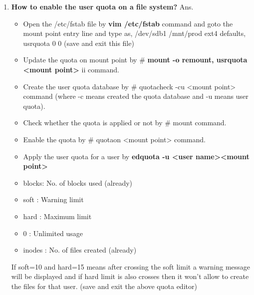 \begin{enumerate}
    \bigskip
    \bigskip

    \item \textbf{How to enable the user quota on a file system?}
    \newline
    Ans.\begin{itemize}
           \item Open the  /etc/fstab   file by  \textbf{ vim  /etc/fstab }command  and  goto the mount point entry line and type as, /dev/sdb1	/mnt/prod	ext4	defaults,  usrquota 	0	0	(save and exit this file)
           \item Update the quota  on mount point by  # \textbf{mount   -o   remount, usrquota    <mount point> } ii	command.
           \item Create the user quota database by  # quotacheck     -cu    <mount point>    command  (where   -c    means  	created the quota database   and   -u   means  user quota).
           \item Check whether the quota is applied  or  not  by   # mount    command.
           \item Enable the quota  by   # quotaon     <mount point>    command.
	         \item Apply the user quota  for a user  by   \textbf{edquota     -u    <user name><mount point>}    
           \item blocks: No. of blocks used  (already)
		       \item soft : Warning limit
		       \item hard : Maximum limit
		       \item 0     : Unlimited usage
		       \item inodes : No. of files created  (already)
        \end{itemize}
        If  soft=10   and   hard=15  means after crossing the soft limit a warning message  will be 
        displayed  and  if 	 hard limit is also crosses then it won't  allow to create the files for that user.
        (save and exit the above quota editor)


\end{enumerate}

